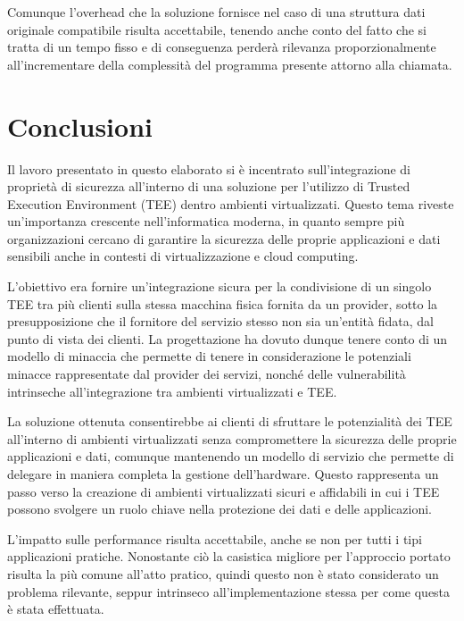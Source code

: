 \documentclass[12pt,italian]{report}
\begin{document}
	\bigbreak 
	
	Comunque l'overhead che la soluzione fornisce nel caso di una struttura dati originale compatibile risulta accettabile, tenendo anche conto del fatto che si tratta di un tempo fisso e di conseguenza perderà rilevanza proporzionalmente all'incrementare della complessità del programma presente attorno alla chiamata.
	
	\chapter{Conclusioni}
	\label{cap:conclusioni}
	Il lavoro presentato in questo elaborato si è incentrato sull'integrazione di proprietà di sicurezza all'interno di una soluzione per l'utilizzo di Trusted Execution Environment (TEE) dentro ambienti virtualizzati. Questo tema riveste un'importanza crescente nell'informatica moderna, in quanto sempre più organizzazioni cercano di garantire la sicurezza delle proprie applicazioni e dati sensibili anche in contesti di virtualizzazione e cloud computing.
	
	\bigbreak
	
	L'obiettivo era fornire un'integrazione sicura per la condivisione di un singolo TEE tra più clienti sulla stessa macchina fisica fornita da un provider, sotto la presupposizione che il fornitore del servizio stesso non sia un'entità fidata, dal punto di vista dei clienti. La progettazione ha dovuto dunque tenere conto di un modello di minaccia che permette di tenere in considerazione le potenziali minacce  rappresentate dal provider dei servizi, nonché delle vulnerabilità intrinseche all'integrazione tra ambienti virtualizzati e TEE.
	
	La soluzione ottenuta consentirebbe ai clienti di sfruttare le potenzialità dei TEE all'interno di ambienti virtualizzati senza compromettere la sicurezza delle proprie applicazioni e dati, comunque mantenendo un modello di servizio che permette di delegare in maniera completa la gestione dell'hardware. Questo rappresenta un passo verso la creazione di ambienti virtualizzati sicuri e affidabili in cui i TEE possono svolgere un ruolo chiave nella protezione dei dati e delle applicazioni.
	
	\bigbreak
	
	L'impatto sulle performance risulta accettabile, anche se non per tutti i tipi applicazioni pratiche. Nonostante ciò la casistica migliore per l'approccio portato risulta la più comune all'atto pratico, quindi questo non è stato considerato un problema rilevante, seppur intrinseco all'implementazione stessa per come questa è stata effettuata.
	
\end{document}
